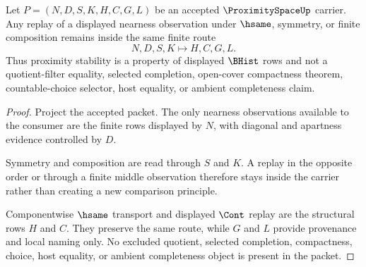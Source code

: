 \begin{theorem}
\label{thm:proximity-space-finite-nearness-stability}
Let $P=(N,D,S,K,H,C,G,L)$ be an accepted $\ProximitySpaceUp$ carrier. Any replay of a displayed nearness observation under $\hsame$, symmetry, or finite composition remains inside the same finite route
$$
N,D,S,K \longmapsto H,C,G,L .
$$
Thus proximity stability is a property of displayed $\BHist$ rows and not a quotient-filter equality, selected completion, open-cover compactness theorem, countable-choice selector, host equality, or ambient completeness claim.
\end{theorem}
\begin{proof}
Project the accepted packet. The only nearness observations available to the consumer are the finite rows displayed by $N$, with diagonal and apartness evidence controlled by $D$.

Symmetry and composition are read through $S$ and $K$. A replay in the opposite order or through a finite middle observation therefore stays inside the carrier rather than creating a new comparison principle.

Componentwise $\hsame$ transport and displayed $\Cont$ replay are the structural rows $H$ and $C$. They preserve the same route, while $G$ and $L$ provide provenance and local naming only. No excluded quotient, selected completion, compactness, choice, host equality, or ambient completeness object is present in the packet.
\end{proof}




